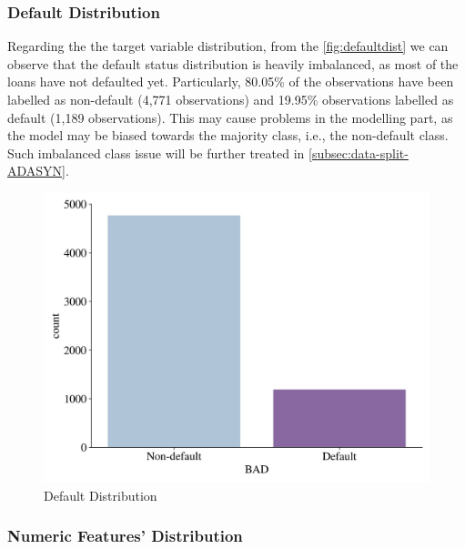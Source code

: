 \subsubsection{Default Distribution}
\label{subsubsec:defaultdist}

Regarding the the target variable distribution, from the \autoref{fig:defaultdist} we can observe that the default status distribution is heavily imbalanced, as most of the loans have not defaulted yet.
Particularly, 80.05\% of the observations have been labelled as non-default (4,771 observations) and 19.95\% observations labelled as default (1,189 observations).
This may cause problems in the modelling part, as the model may be biased towards the majority class, i.e., the non-default class. Such imbalanced class issue will be further treated in \autoref{subsec:data-split-ADASYN}.

\begin{figure}[H]
\centering
\caption{Default Distribution}
\label{fig:defaultdist}
\includegraphics[width=130mm]{Figures/Default_Distribution.jpg}\vspace{-1em}

\vspace{-1em}
\end{figure}

\subsubsection{Numeric Features' Distribution}
\label{subsubsec:numdist}

